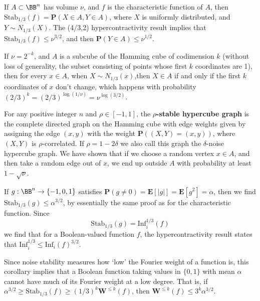 \begin{corollary}
    If $A \subset \BB^n$ has volume $\nu$, and $f$ is the characteristic function of $A$, then $\text{Stab}_{1/3}(f) = \mathbf{P}(X \in A, Y \in A)$, where $X$ is uniformly distributed, and $Y \sim N_{1/3}(X)$. The (4/3,2) hypercontractivity result implies that $\text{Stab}_{1/3}(f) \leq \nu^{3/2}$, and then $\mathbf{P}(Y \in A) \leq \nu^{1/2}$.
\end{corollary}

\begin{example}
    If $\nu = 2^{-k}$, and $A$ is a subcube of the Hamming cube of codimension $k$ (without loss of generality, the subset consisting of points whose first $k$ coordinates are 1), then for every $x \in A$, when $X \sim N_{1/3}(x)$,then $X \in A$ if and only if the first $k$ coordinates of $x$ don't change, which happens with probability $(2/3)^k = (2/3)^{\log(1/\nu)} = \nu^{\log(3/2)}$.
\end{example}

\begin{example}
    For any positive integer $n$ and $\rho \in [-1,1]$, the {\bf $\rho$-stable hypercube graph} is the complete directed graph on the Hamming cube with edge weights given by assigning the edge $(x,y)$ with the weight $\mathbf{P}((X,Y) = (x,y))$, where $(X,Y)$ is $\rho$-correlated. If $\rho = 1 - 2\delta$ we also call this graph the $\delta$-noise hypercube graph. We have shown that if we choose a random vertex $x \in A$, and then take a random edge out of $x$, we end up outside $A$ with probability at least $1 - \sqrt{\nu}$.
\end{example}

If $g: \BB^n \to \{ -1, 0 ,1 \}$ satisfies $\mathbf{P}(g \neq 0) = \mathbf{E}[|g|] = \mathbf{E}[g^2] = \alpha$, then we find $\text{Stab}_{1/3}(g) \leq \alpha^{3/2}$, by essentially the same proof as for the characteristic function. Since
%
\[ \text{Stab}_{1/3}(g) = \text{Inf}_i^{1/3}(f) \]
%
we find that for a Boolean-valued function $f$, the hypercontractivity result states that $\text{Inf}_i^{1/3} \leq \text{Inf}_i(f)^{3/2}$.

Since noise stability measures how `low' the Fourier weight of a function is, this corollary implies that a Boolean function taking values in $\{ 0, 1 \}$ with mean $\alpha$ cannot have much of its Fourier weight at a low degree. That is, if $\alpha^{3/2} \geq \text{Stab}_{1/3}(f) \geq (1/3)^k \mathbf{W}^{\leq k}(f)$, then $\mathbf{W}^{\leq k}(f) \leq 3^k \alpha^{3/2}$.

